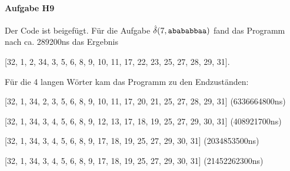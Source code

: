 \documentclass[11pt]{article}
\begin{document}
\paragraph{Aufgabe H9}
Der Code ist beigefügt. Für die Aufgabe $\hat{\delta}(7,\verb|abababbaa|)$ fand das Programm nach ca. 289200ns das Ergebnis
\begin{center}
[32, 1, 2, 34, 3, 5, 6, 8, 9, 10, 11, 17, 22, 23, 25, 27, 28, 29, 31].
\end{center}

Für die 4 langen Wörter kam das Programm zu den Endzuständen:
\begin{center}
[32, 1, 34, 2, 3, 5, 6, 8, 9, 10, 11, 17, 20, 21, 25, 27, 28, 29, 31] (6336664800ns)

[32, 1, 34, 3, 4, 5, 6, 8, 9, 12, 13, 17, 18, 19, 25, 27, 29, 30, 31] (408921700ns)

[32, 1, 34, 3, 4, 5, 6, 8, 9, 17, 18, 19, 25, 27, 29, 30, 31] (2034853500ns)

[32, 1, 34, 3, 4, 5, 6, 8, 9, 17, 18, 19, 25, 27, 29, 30, 31] (21452262300ns)
\end{center}
\end{document}
